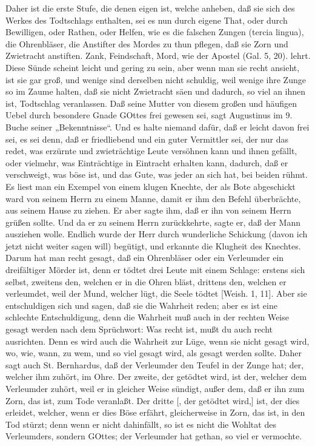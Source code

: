 Daher ist die erste Stufe, die denen eigen ist, welche anheben, daß sie sich des Werkes des Todtschlags enthalten, sei es nun durch eigene That, oder durch Bewilligen, oder Rathen, oder Helfen, wie es die falschen Zungen (tercia lingua), die Ohrenbläser, die Anstifter des Mordes zu thun pflegen, daß sie Zorn und Zwietracht anstiften. Zank, Feindschaft, Mord, wie der Apostel (Gal. 5, 20). lehrt. Diese Sünde scheint leicht und gering zu sein, aber wenn man sie recht ansieht, ist sie gar groß, und wenige sind derselben nicht schuldig, weil wenige ihre Zunge so im Zaume halten, daß sie nicht Zwietracht säen und dadurch, so viel an ihnen ist, Todtschlag veranlassen. Daß seine Mutter von diesem großen und häufigen Uebel durch besondere Gnade GOttes frei gewesen sei, sagt Augustinus im 9. Buche seiner „Bekenntnisse“. Und es halte niemand dafür, daß er leicht davon frei sei, es sei denn, daß er friedliebend und ein guter Vermittler sei, der nur das redet, was erzürnte und zwieträchtige Leute versöhnen kann und ihnen gefällt, oder vielmehr, was Einträchtige in Eintracht erhalten kann, dadurch, daß er verschweigt, was böse ist, und das Gute, was jeder an sich hat, bei beiden rühmt. Es liest man ein Exempel von einem klugen Knechte, der als Bote abgeschickt ward von seinem Herrn zu einem Manne, damit er ihm den Befehl überbrächte, aus seinem Hause zu ziehen. Er aber sagte ihm, daß er ihn von seinem Herrn grüßen sollte. Und da er zu seinem Herrn zurückkehrte, sagte er, daß der Mann ausziehen wolle. Endlich wurde der Herr durch wunderliche Schickung (davon ich jetzt nicht weiter sagen will) begütigt, und erkannte die Klugheit des Knechtes. Darum hat man recht gesagt, daß ein Ohrenbläser oder ein Verleumder ein dreifältiger Mörder ist, denn er tödtet drei Leute mit einem Schlage: erstens sich selbst, zweitens den, welchen er in die Ohren bläst, drittens den, welchen er verleumdet, weil der Mund, welcher lügt, die Seele tödtet [Weish. 1, 11]. Aber sie entschuldigen sich und sagen, daß sie die Wahrheit reden; aber es ist eine schlechte Entschuldigung, denn die Wahrheit muß auch in der rechten Weise gesagt werden nach dem Sprüchwort: Was recht ist, mußt du auch recht ausrichten. Denn es wird auch die Wahrheit zur Lüge, wenn sie nicht gesagt wird, wo, wie, wann, zu wem, und so viel gesagt wird, als gesagt werden sollte. Daher sagt auch St. Bernhardus, daß der Verleumder den Teufel in der Zunge hat; der, welcher ihm zuhört, im Ohre. Der zweite, der getödtet wird, ist der, welcher dem Verleumder zuhört, weil er in gleicher Weise
sündigt, außer dem, daß er ihn zum Zorn, das ist, zum Tode veranlaßt. Der dritte [, der getödtet wird,] ist, der dies erleidet, welcher, wenn er dies Böse erfährt, gleicherweise in Zorn, das ist, in den Tod stürzt; denn wenn er nicht dahinfällt, so ist es nicht die Wohltat des Verleumders, sondern GOttes; der Verleumder hat gethan, so viel er vermochte.

